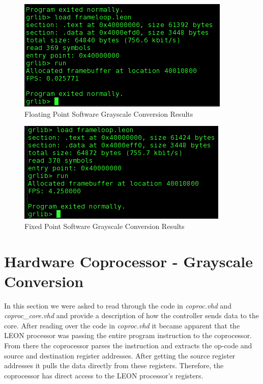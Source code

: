 \documentclass{article}
\begin{document}
	 \begin{figure}[H]
	 	\begin{center}
	 		\includegraphics[scale=0.6]{../part4_files/Floating_Point_Grayscale_Screenshot.png}
	 		\caption{Floating Point Software Grayscale Conversion Results}
	 	\end{center}
	 \end{figure}
	 
	 \begin{figure}[H]
	 	\begin{center}
	 		\includegraphics[scale=0.6]{../part4_files/Fixed_point_grayscale_resluts_screenshot.png}
	 		\caption{Fixed Point Software Grayscale Conversion Results}
	 	\end{center}
	 \end{figure}


\section{Hardware Coprocessor - Grayscale Conversion}
In this section we were asked to read through the code in \textit{coproc.vhd} and \textit{coproc\_core.vhd} and provide a description of how the controller sends data to the core. After reading over the code in \textit{coproc.vhd} it became apparent that the LEON processor was passing the entire program instruction to the coprocessor. From there the coprocessor parses the instruction and extracts the op-code and source and destination register addresses. After getting the source register addresses it pulls the data directly from these registers. Therefore, the coprocessor has direct access to the LEON processor's registers. \\
\end{document}
